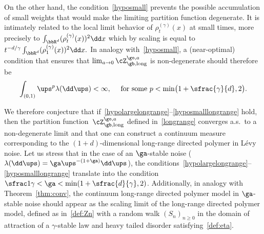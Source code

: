 On the other hand, the condition~\eqref{hyposmall}
prevents the possible accumulation of small weights that would make the limiting partition function degenerate.
It is intimately related to the local limit behavior of $\rho_t^{(\gamma)}(x)$ at small times, more precisely to
$\int_{\bbR^d} (\rho_t^{(\gamma)}(x))^2 \dd x$ which by scaling is equal to $t^{-d/\gamma} \int_{\bbR^d} (\rho_1^{(\gamma)}(x))^2 \dd x.$
In analogy with~\eqref{hyposmall}, a (near-optimal) condition that ensures that $ \lim_{a\to 0}\cZ_{\gb, \mathrm{long}}^{\go,a}$ is non-degenerate should therefore be
\begin{equation}
\label{hyposmalllongrange}
\int_{(0,1)} \ups^{p} \lambda(\dd \ups) <\infty,\quad \text{ for some } p< \min \bigl(1+\sfrac{\gamma}{d}, 2 \bigr).
\end{equation}

We therefore conjecture that if~\eqref{hypolargelongrange}--\eqref{hyposmalllongrange} hold,
then the partition function~$\cZ_{\gb,\mathrm{long}}^{\go,a}$ defined in~\eqref{longrange} converges a.s.\ to a non-degenerate limit and that one can construct a continuum measure corresponding to the $(1+d)$-dimensional long-range directed polymer in Lévy noise.
Let us stress that in the case of an $\ga$-stable noise (\ie $\lambda(\dd \ups) = \ga \ups^{-(1+\ga)} \dd \ups$),
the conditions~\eqref{hypolargelongrange}--\eqref{hyposmalllongrange} translate into the condition $\sfrac1\gamma < \ga < \min(1+\sfrac{d}{\gamma}, 2)$.
Additionally, in analogy with Theorem~\ref{thm:conv}, the continuum long-range directed polymer model in $\ga$-stable noise should appear
as the scaling limit of the long-range
directed polymer model, defined as in~\eqref{def:Zn}
with a random walk $(S_n)_{n\geq 0}$
in the domain of attraction of a $\gamma$-stable law
and heavy tailed disorder satisfying~\eqref{def:eta}.

